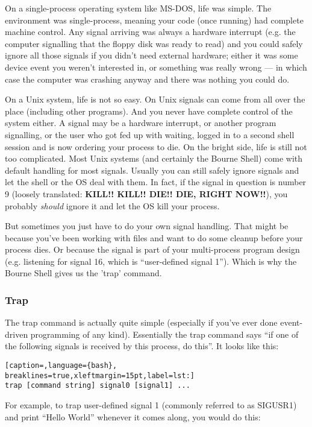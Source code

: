 On a single-process operating system like MS-DOS, life was simple. The
environment was single-process, meaning your code (once running) had complete
machine control. Any signal arriving was always a hardware interrupt (e.g. the
computer signalling that the floppy disk was ready to read) and you could
safely ignore all those signals if you didn't need external hardware; either it
was some device event you weren't interested in, or something was really wrong
--- in which case the computer was crashing anyway and there was nothing you
could do.

On a Unix system, life is not so easy. On Unix signals can come from all over
the place (including other programs). And you never have complete control of
the system either. A signal may be a hardware interrupt, or another program
signalling, or the user who got fed up with waiting, logged in to a second
shell session and is now ordering your process to die. On the bright side, life
is still not too complicated. Most Unix systems (and certainly the Bourne
Shell) come with default handling for most signals. Usually you can still
safely ignore signals and let the shell or the OS deal with them. In fact, if
the signal in question is number 9 (loosely translated: \textbf{KILL!! KILL!!
DIE!! DIE, RIGHT NOW!!}), you probably \emph{should} ignore it and let the OS
kill your process.

But sometimes you just have to do your own signal handling. That might be
because you've been working with files and want to do some cleanup before your
process dies. Or because the signal is part of your multi-process program
design (e.g. listening for signal 16, which is ``user-defined signal 1'').
Which is why the Bourne Shell gives us the 'trap' command.

\subsubsection{Trap}
The trap command is actually quite simple (especially if you've ever done
event-driven programming of any kind). Essentially the trap command says ``if
one of the following signals is received by this process, do this''. It looks
like this:
\lstset{basicstyle=\scriptsize, numbers=left, captionpos=b, tabsize=4}
\begin{lstlisting}[caption=,language={bash},
breaklines=true,xleftmargin=15pt,label=lst:]
trap [command string] signal0 [signal1] ...
\end{lstlisting}

For example, to trap user-defined signal 1 (commonly referred to as SIGUSR1)
and print ``Hello World'' whenever it comes along, you would do this:


